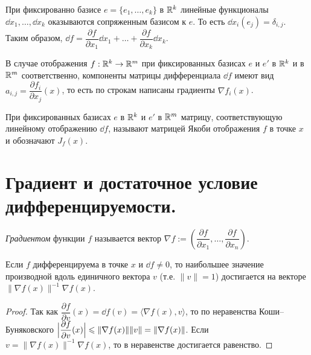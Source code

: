 \documentclass[a4paper]{article}
\theoremstyle{named}
\begin{document}
    \begin{remark*}
        При фиксированно базисе $e = \{e_1, \dots, e_k\}$ в $\RR^k$ линейные функционалы $\dd x_1, \dots, \dd x_k$ оказываются сопряженным базисом к $e$. То есть $\dd x_i(e_j) = \delta_{i, j}$. Таким образом, $\dd f = \dfrac{\partial f}{\partial x_1}\dd x_1 + \dots + \dfrac{\partial f}{\partial x_k}\dd x_k$.
    \end{remark*}

    \begin{remark*}
        В случае отображения $f: \RR^k \to \RR^m$ при фиксированных базисах $e$ и $e'$ в $\RR^k$ и в $\RR^m$ соответственно, компоненты матрицы дифференциала $\dd f$ имеют вид $a_{i, j} = \dfrac{\partial f_i}{\partial x_j}(x)$, то есть по строкам написаны градиенты $\nabla f_i(x)$.
    \end{remark*}

    \begin{definition*}
        При фиксированных базисах $e$ в $\RR^k$ и $e'$ в $\RR^m$ матрицу, соответствующую линейному отображению $\dd f$, называют матрицей Якоби отображения $f$ в точке $x$ и обозначают $J_f(x)$.
    \end{definition*}

    \section{Градиент и достаточное условие дифференцируемости.}

    \begin{definition*}
        {\it Градиентом} функции $f$ называется вектор
        $\nabla f:=\left(\dfrac{\partial f}{\partial x_1},\ldots,\dfrac{\partial f}{\partial x_n}\right)$.
    \end{definition*}

    \begin{lemma*}
        Если $f$ дифференцируема в точке $x$ и $\dd f\ne0$, то наибольшее значение производной вдоль единичного вектора
        $v$ (т.е. $\|v\|=1$) достигается на векторе $\|\nabla f(x)\|^{-1}\nabla f(x)$.
    \end{lemma*}

    \begin{proof}
        Так как $\dfrac{\partial f}{\partial v}(x) = \dd f(v) = \langle\nabla f(x), v\rangle$,
        то по неравенства Коши--Буняковского $\Bigl|\dfrac{\partial f}{\partial v}(x)\Bigr|\leq \|\nabla f(x)\|\|v\|
        =\|\nabla f(x)\|$. Если $v=\|\nabla f(x)\|^{-1}\nabla f(x)$, то в неравенстве достигается равенство.
    \end{proof}
\end{document}
